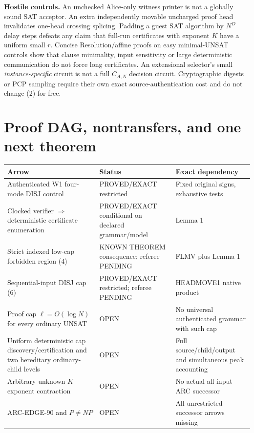 \documentclass[11pt]{article}
\begin{document}
\noindent\textbf{Hostile controls.} An unchecked Alice-only
witness printer is not a globally sound SAT acceptor.
An extra independently movable uncharged proof head
invalidates one-head crossing splicing. Padding a guest SAT
algorithm by $N^D$ delay steps defeats any claim that
full-run certificates with exponent $K$ have a uniform
small $r$. Concise Resolution/affine proofs on easy
minimal-UNSAT controls show that clause minimality,
input sensitivity or large deterministic communication
do not force long certificates. An extensional selector's
small \emph{instance-specific} circuit is not a full
$C_{A,N}$ decision circuit. Cryptographic digests or PCP
sampling require their own exact source-authentication
cost and do not change (2) for free.

\section{Proof DAG, nontransfers, and one next theorem}
\begin{center}\small
\begin{tabularx}{.96\linewidth}{p{.40\linewidth}p{.23\linewidth}X}
\toprule
Arrow & Status & Exact dependency\\\midrule
Authenticated W1 four-mode DISJ control &
PROVED/EXACT restricted & Fixed original signs, exhaustive tests\\
Clocked verifier $\Rightarrow$ deterministic certificate enumeration &
PROVED/EXACT conditional on declared grammar/model & Lemma 1\\
Strict indexed low-cap forbidden region (4) &
KNOWN THEOREM consequence; referee PENDING & FLMV plus Lemma 1\\
Sequential-input DISJ cap (6) &
PROVED/EXACT restricted; referee PENDING & HEADMOVE1 native product\\
Proof cap $\ell=O(\log N)$ for every ordinary UNSAT &
OPEN & No universal authenticated grammar with such cap\\
Uniform deterministic cap discovery/certification and two hereditary
ordinary-child levels &
OPEN & Full source/child/output and simultaneous peak accounting\\
Arbitrary unknown-$K$ exponent contraction &
OPEN & No actual all-input ARC successor\\
ARC-EDGE-90 and $P\ne NP$ &
OPEN & All unrestricted successor arrows missing\\\bottomrule
\end{tabularx}
\end{center}
\end{document}
